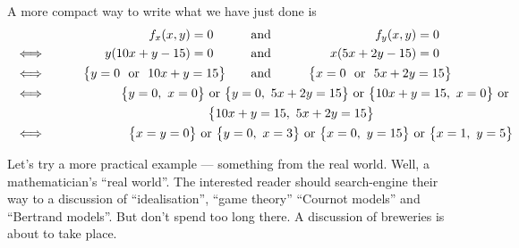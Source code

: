 \begin{eg}[$f(x,y) = xy(5x+y-15)$]
A more compact way to write what we have just done is
\begin{alignat*}{3}
&           &f_x(x,y)=0\quad\qquad 
            & \text{and}\qquad 
            & f_y(x,y)=0\quad \\
& \iff\qquad          &y(10x+y-15)=0\quad\qquad 
            & \text{and}\qquad 
            & x(5x+2y-15)=0\quad \\
&\iff\qquad & \big\{y=0\text{\ \  or\ \  }10x+y=15\big\}\qquad 
            & \text{and}\qquad
            &\big\{x=0\text{\ \ or\ \ }5x+2y=15\big\}\\
&\iff\qquad & \big\{y=0,\ x=0\big\}\text{ or }
       \big\{y=0,\ 5x+2y=15\big\}\text{ or }
       \big\{10x+y=15,\ x=0\big\}\text{ or }\hskip-2.9in \\
      \hskip1in \big\{10x+y=15,\ 5x+2y=15\big\}\hskip-4in\\
&\iff\qquad & \big\{x=y=0\big\}\text{ or }
       \big\{y=0,\ x=3\big\}\text{ or }
       \big\{x=0,\ y=15\big\}\text{ or }
       \big\{x=1,\ y=5\big\}\hskip-2.9in
\end{alignat*}
\end{eg}

Let's try a more practical example --- something from the real world.
Well, a mathematician's ``real world''. The interested reader should search-engine their way to a discussion of ``idealisation'', ``game theory''
``Cournot models'' and ``Bertrand models''. But don't spend too long there.
A discussion of breweries is about to take place.

